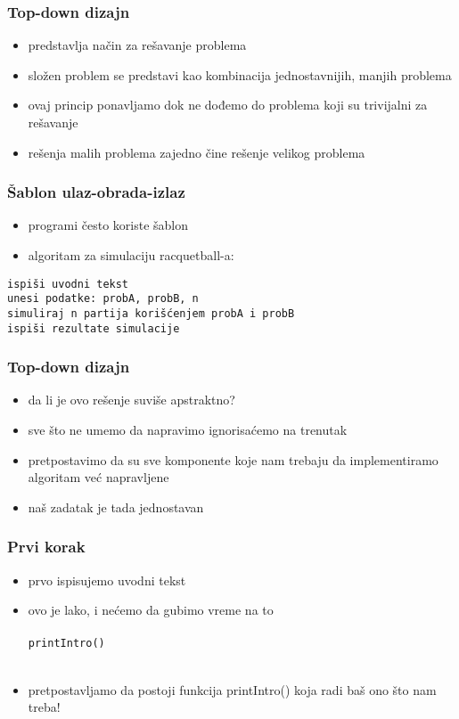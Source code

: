 \documentclass[utf8,compress,aspectratio=169]{beamer}
\begin{document}
\begin{frame}
  \frametitle{Top-down dizajn}
  \begin{itemize}
    \item {} predstavlja način za rešavanje problema
    \item složen problem se predstavi kao kombinacija jednostavnijih, manjih problema
    \item ovaj princip ponavljamo dok ne dođemo do problema koji su trivijalni za rešavanje
    \item rešenja malih problema zajedno čine rešenje velikog problema
  \end{itemize}
\end{frame}

\begin{frame}[fragile]
  \frametitle{Šablon ulaz-obrada-izlaz}
  \begin{itemize}
    \item programi često koriste šablon 
    \item algoritam za simulaciju racquetball-a:
  \end{itemize}
\begin{verbatim}
ispiši uvodni tekst
unesi podatke: probA, probB, n
simuliraj n partija korišćenjem probA i probB
ispiši rezultate simulacije
\end{verbatim}
\end{frame}

\begin{frame}
  \frametitle{Top-down dizajn}
  \begin{itemize}
    \item da li je ovo rešenje suviše apstraktno?
    \item sve što ne umemo da napravimo ignorisaćemo na trenutak
    \item pretpostavimo da su sve komponente koje nam trebaju da implementiramo algoritam već napravljene
    \item naš zadatak je tada jednostavan
  \end{itemize}
\end{frame}

\begin{frame}
  \frametitle{Prvi korak}
  \begin{itemize}
    \item prvo ispisujemo uvodni tekst
    \item ovo je lako, i nećemo da gubimo vreme na to \\ \ \\
      \texttt{printIntro()} \\ \ \\
    \item pretpostavljamo da postoji funkcija printIntro() koja radi baš ono što nam treba!
  \end{itemize}
\end{frame}
\end{document}
